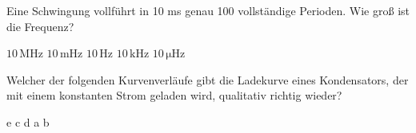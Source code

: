 \documentclass[11pt]{exam}
\begin{document}
\begin{questions}
\vspace{3mm}\question Eine Schwingung vollführt in 10 ms genau 100 vollständige Perioden. Wie groß ist die Frequenz?

\begin{choices}
	\choice \(\mathrm{10\,MHz}\)
	\choice \(\mathrm{10\,mHz}\)
	\choice \(\mathrm{10\,Hz}\)
	\choice \(\mathrm{10\,kHz}\)
	\choice \(\mathrm{10\,\mu Hz}\)
\end{choices}

\vspace{3mm}\question Welcher der folgenden Kurvenverläufe gibt die Ladekurve eines Kondensators, der mit einem konstanten Strom geladen wird, qualitativ richtig wieder?

\begin{choices}
	\choice e
	\choice c
	\choice d
	\choice a
	\choice b
\end{choices}

\vspace{3mm}\end{questions}
\end{document}
